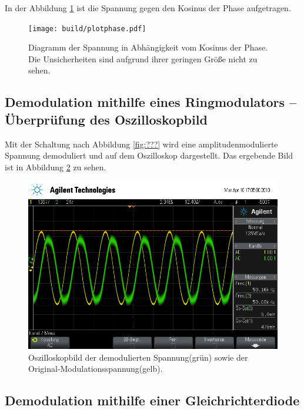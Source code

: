 In der Abbildung \ref{fig:plotphase} ist die Spannung gegen den Kosinus der Phase aufgetragen.

\begin{figure}
  \centering
  \texttt{[image: build/plotphase.pdf]}
  \caption{Diagramm der Spannung in Abhängigkeit vom Kosinus der Phase. Die Unsicherheiten sind aufgrund ihrer geringen Größe nicht zu sehen.}
  \label{fig:plotphase}
\end{figure}

\subsection{Demodulation mithilfe eines Ringmodulators -- Überprüfung des Oszilloskopbild}

Mit der Schaltung nach Abbildung \ref{fig:???} wird eine amplitudenmodulierte Spannung demoduliert und auf dem Oszilloskop dargestellt. Das ergebende Bild ist in Abbildung \ref{fig:demodRing} zu sehen.

\begin{figure}[h]
  \centering
  \includegraphics[width=.9\textwidth]{Oszi_Pics/demodRing.png}
  \caption{Oszilloskopbild der demodulierten Spannung(grün) sowie der Original-Modulationsspannung(gelb).}
  \label{fig:demodRing}
\end{figure}

\subsection{Demodulation mithilfe einer Gleichrichterdiode}

